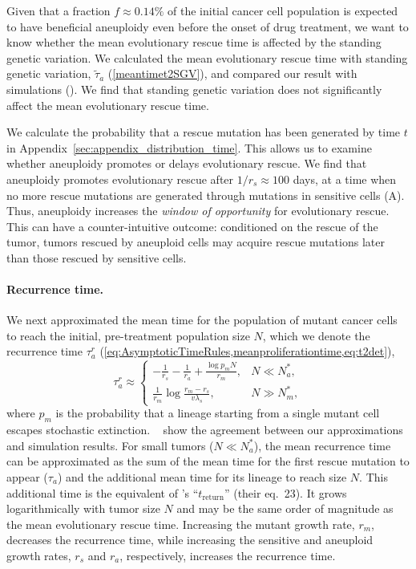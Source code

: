\documentclass[12pt]{extarticle}
\renewcommand{\Delta}{r}
\begin{document}
Given that a fraction $f\approx 0.14\%$ of the initial cancer cell population is expected to have beneficial aneuploidy even before the onset of drug treatment, we want to know whether the mean evolutionary rescue time is affected by the standing genetic variation. We calculated the mean evolutionary rescue time with standing genetic variation, $\tilde{\tau}_a$ (\cref{meantimet2SGV}), and compared our result with simulations (). We find that standing genetic variation does not significantly affect the mean evolutionary rescue time. 

We calculate the probability that a rescue mutation has been generated by time $t$ in Appendix~\ref{sec:appendix_distribution_time}. This allows us to examine whether aneuploidy promotes or delays evolutionary rescue. 
We find that aneuploidy promotes evolutionary rescue after $1/\Delta_s\approx100$ days, at a time when no more rescue mutations are generated through mutations in sensitive cells (A). Thus, aneuploidy increases the \emph{window of opportunity} for evolutionary rescue. This can have a counter-intuitive outcome: conditioned on the rescue of the tumor, tumors rescued by aneuploid cells may acquire rescue mutations later than those rescued by sensitive cells. %

\paragraph{Recurrence time.}

We next approximated the mean time for the population of mutant cancer cells to reach the initial, pre-treatment population size $N$, which we denote the recurrence time $\tau_a^r$ (\cref{eq:AsymptoticTimeRules,meanproliferationtime,eq:t2det}),
\begin{equation} \label{eq:AsymptoticTimeRulesRecurrence}
\tau_a^r \approx \begin{cases}
   -\frac{1}{\Delta_s}-\frac{1}{\Delta_a}+\frac{\log p_mN}{\Delta_m} ,&
 N \ll N_a^* ,\\ 
  \frac{1}{\Delta_m}\log\frac{\Delta_m-\Delta_s}{v\lambda_s}  ,&
  N \gg N_m^* ,
  \end{cases}
\end{equation}
where $p_m$ is the probability that a lineage starting from a single mutant cell escapes stochastic extinction. %
  ~ show the agreement between our approximations and simulation results.
For small tumors ($N \ll N_a^*$), the mean recurrence time can be approximated as the sum of the mean time for the first rescue mutation to appear ($\tau_a$) and the additional mean time for its lineage to reach size $N$. 
This additional time is the equivalent of \citet{orr2014population}'s ``$t_\text{return}$'' (their eq.~23). 
It grows logarithmically with tumor size $N$ and may be the same order of magnitude as the mean evolutionary rescue time. 
Increasing the mutant growth rate, $\Delta_m$, decreases the recurrence time, while increasing the sensitive and aneuploid growth rates, $\Delta_s$ and $\Delta_a$, respectively, increases the recurrence time.
\end{document}

